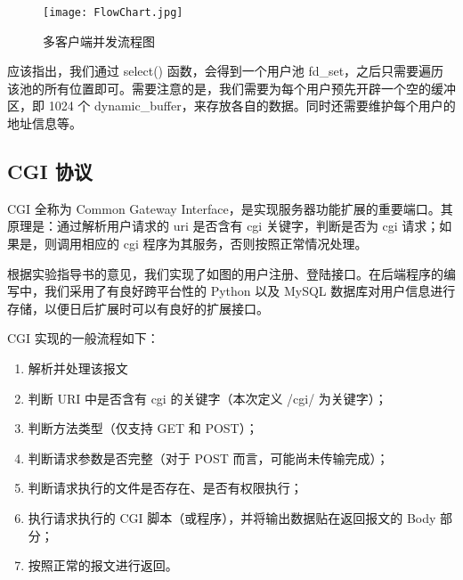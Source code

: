 \begin{figure}[htbp!]
  \centering
  \texttt{[image: FlowChart.jpg]}
  \caption{多客户端并发流程图}\label{fig:MultipleChart}
\end{figure}

应该指出，我们通过 select() 函数，会得到一个用户池 fd\_set，之后只需要遍历该池的所有位置即可。需要注意的是，我们需要为每个用户预先开辟一个空的缓冲区，即 1024 个 dynamic\_buffer，来存放各自的数据。同时还需要维护每个用户的地址信息等。

\subsection{CGI 协议}

CGI 全称为 Common Gateway Interface，是实现服务器功能扩展的重要端口。其原理是：通过解析用户请求的 uri 是否含有 cgi 关键字，判断是否为 cgi 请求；如果是，则调用相应的 cgi 程序为其服务，否则按照正常情况处理。

根据实验指导书的意见，我们实现了如图的用户注册、登陆接口。在后端程序的编写中，我们采用了有良好跨平台性的 Python 以及 MySQL 数据库对用户信息进行存储，以便日后扩展时可以有良好的扩展接口。


CGI 实现的一般流程如下：
\begin{enumerate}
  \item 解析并处理该报文
  \item 判断 URI 中是否含有 cgi 的关键字（本次定义 /cgi/ 为关键字）；
  \item 判断方法类型（仅支持 GET 和 POST）；
  \item 判断请求参数是否完整（对于 POST 而言，可能尚未传输完成）；
  \item 判断请求执行的文件是否存在、是否有权限执行；
  \item 执行请求执行的 CGI 脚本（或程序），并将输出数据贴在返回报文的 Body 部分；
  \item 按照正常的报文进行返回。
\end{enumerate}
